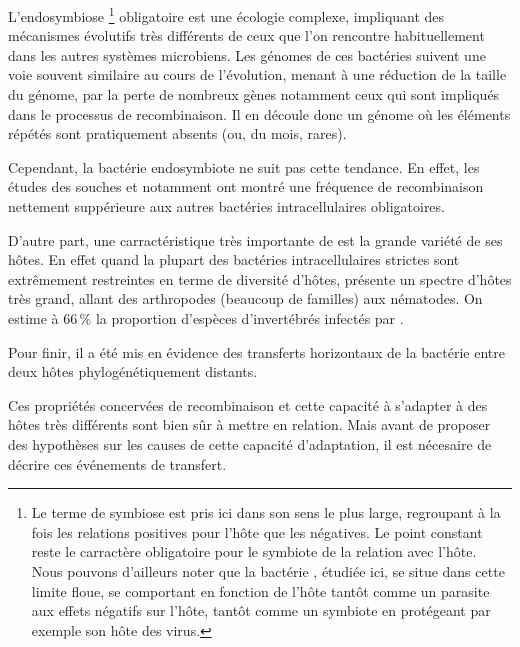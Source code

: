 L’endosymbiose%
\footnote{Le terme de symbiose est pris ici dans son sens le plus large, regroupant à la fois les relations positives pour l’hôte que les négatives. Le point constant reste le carractère obligatoire pour le symbiote de la relation avec l’hôte.\\
Nous pouvons d’ailleurs noter que la bactérie , étudiée ici, se situe dans cette limite floue, se comportant en fonction de l’hôte tantôt comme un parasite aux effets négatifs sur l’hôte\cite{Werren2008}, tantôt comme un symbiote en protégeant par exemple son hôte des virus.}
obligatoire est une écologie complexe, impliquant des mécanismes évolutifs très différents de ceux que l’on rencontre habituellement dans les autres systèmes microbiens.
Les génomes de ces bactéries suivent une voie souvent similaire au cours de l’évolution, menant à une réduction de la taille du génome, par la perte de nombreux gènes\cite{wernegreen2002} notamment ceux qui sont impliqués dans le processus de recombinaison.
Il en découle donc un génome où les éléments répétés sont pratiquement absents (ou, du mois, rares\cite{Bordenstein2005}).

Cependant, la bactérie endosymbiote  ne suit pas cette tendance. En effet, les études des souches  et  notamment ont montré une fréquence de recombinaison nettement suppérieure aux autres bactéries intracellulaires obligatoires\cite{Wu2004}.

D’autre part, une carractéristique très importante de  est la grande variété de ses hôtes. En effet quand la plupart des bactéries intracellulaires strictes sont extrêmement restreintes en terme de diversité d’hôtes,  présente un spectre d’hôtes très grand, allant des arthropodes (beaucoup de familles) aux nématodes. On estime à 66\,\% la proportion d’espèces d’invertébrés infectés par \cite{hilgenboecker2008}.

Pour finir, il a été mis en évidence \cite{vavre1999} des transferts horizontaux de la bactérie entre deux hôtes phylogénétiquement distants.

Ces propriétés concervées de recombinaison et cette capacité à s’adapter à des hôtes très différents sont bien sûr à mettre en relation.
Mais avant de proposer des hypothèses sur les causes de cette capacité d’adaptation, il est nécesaire de décrire ces événements de transfert.

